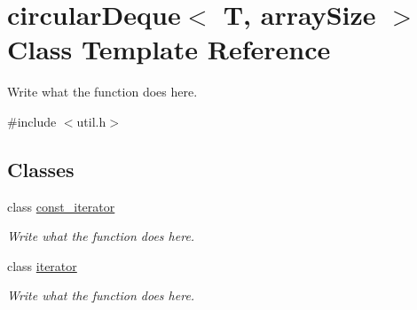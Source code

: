 \hypertarget{classcircularDeque}{\section{circular\+Deque$<$ T, array\+Size $>$ Class Template Reference}
\label{classcircularDeque}
}


Write what the function does here.  




{\ttfamily \#include $<$util.\+h$>$}

\subsection*{Classes}
\begin{DoxyCompactItemize}
\item 
class \hyperlink{classcircularDeque_1_1const__iterator}{const\+\_\+iterator}
\begin{DoxyCompactList}\small\item\em Write what the function does here. \end{DoxyCompactList}\item 
class \hyperlink{classcircularDeque_1_1iterator}{iterator}
\begin{DoxyCompactList}\small\item\em Write what the function does here. \end{DoxyCompactList}\end{DoxyCompactItemize}
